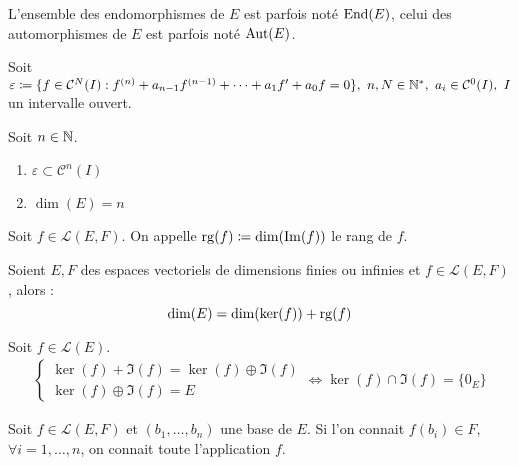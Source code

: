 \begin{remark}
    L'ensemble des endomorphismes de $E$ est parfois noté $\operatorname{End}(E)$, celui des automorphismes de $E$ est parfois noté $\operatorname{Aut}(E)$.
\end{remark}

Soit $\varepsilon \coloneqq \{ f \in \mathcal{C}^N(I) : f^{(n)} + a_{n - 1} f^{(n - 1)} + \cdots + a_1 f' + a_0 f = 0 \},\ n, N \in \mathbb{N}^*,\ a_i \in \mathcal{C}^0(I),\ I$ un intervalle ouvert.

\begin{proposition}
    Soit $n \in \mathbb{N}$.
    \begin{multicols}{2}
        \begin{enumerate}
            \item $\varepsilon \subset \mathcal{C}^n(I)$
            \item $\dim(E) = n$
        \end{enumerate}
    \end{multicols}
\end{proposition}

\begin{definition}
    Soit $f \in \mathcal{L}(E, F)$. On appelle $\operatorname{rg}(f) \coloneqq \dim(\Im(f))$ le rang de $f$.
\end{definition}

\begin{theorem}
    Soient $E, F$ des espaces vectoriels de dimensions finies ou infinies et $f \in \mathcal{L}(E, F)$, alors :
    \[ \dim(E) = \dim(\ker(f)) + \operatorname{rg}(f) \]
\end{theorem}

\begin{corollary}
    Soit $f \in \mathcal{L}(E)$.
    \begin{align*}
        \begin{cases}
            \ker(f) + \Im(f) = \ker(f) \oplus \Im(f) \\
            \ker(f) \oplus \Im(f) = E
        \end{cases}
        \iff 
        \ker(f) \cap \Im(f) = \{0_E\}
    \end{align*}
\end{corollary}

\begin{proposition}
    Soit $f \in \mathcal{L}(E, F)$ et $(b_1, \ldots, b_n)$ une base de $E$. Si l'on connait $f(b_i) \in F$, $\forall i = 1, \ldots, n$, on connait toute l'application $f$.
\end{proposition}

